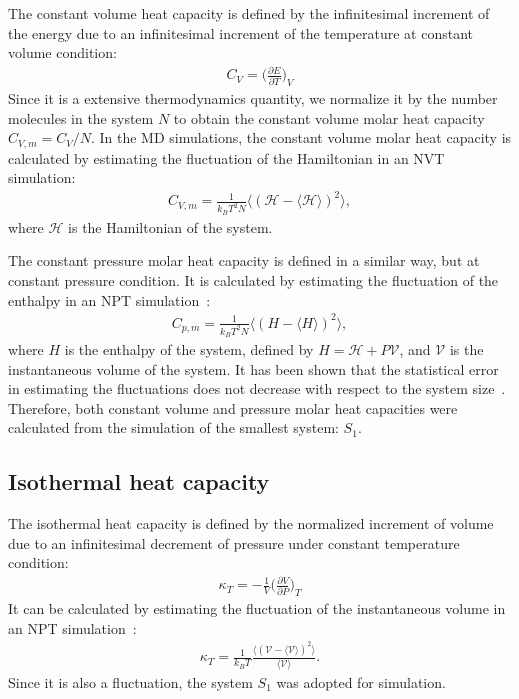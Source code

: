 \documentclass[a4paper,preprint,unsortedaddress,onecolumn,fleqn]{revtex4}
\newcommand{\systemsb}{S_1}
\begin{document}
The constant volume heat capacity is defined by the infinitesimal increment
of the energy due to an infinitesimal increment of the temperature at
constant volume condition: 
\begin{align}
C_V = \Big(\frac{\partial E}{\partial T}\Big)_V
\end{align}
Since it is a extensive thermodynamics quantity, we normalize it by the
number molecules in the system $N$ to obtain the constant volume molar heat
capacity $C_{V,m} = C_V/N$. In the MD simulations, the constant volume molar
heat capacity is calculated by estimating the fluctuation of the Hamiltonian
in an NVT simulation: 
\begin{align}
C_{V,m} = \frac{1}{k_BT^2 N} \langle (\mathcal{H }- \langle\mathcal{H}%
\rangle)^2 \rangle,
\end{align}
where $\mathcal{H}$ is the Hamiltonian of the system. 

The constant pressure molar heat capacity is defined in a similar way, but
at constant pressure condition. It is calculated by estimating the
fluctuation of the enthalpy in an NPT simulation~\cite{wang2011existence}: 
\begin{align}
C_{p,m} = \frac{1}{k_BT^2 N} \langle ( H - \langle H\rangle)^2 \rangle,
\end{align}
where $H$ is the enthalpy of the system, defined by $H = \mathcal{H }+ P%
\mathcal{V}$, and $\mathcal{V}$ is the instantaneous volume of the system.
It has been shown that the statistical error in estimating the fluctuations
does not decrease with respect to the system size~\cite%
{milchev1986fluctuations,ferrenberg1991statistical}. Therefore, both
constant volume and pressure molar heat capacities were calculated from the
simulation of the smallest system: $S_1$.

\subsection{Isothermal heat capacity}

The isothermal heat capacity is defined by the normalized increment of
volume due to an infinitesimal decrement of pressure under constant
temperature condition: 
\begin{align}
\kappa_T = - \frac 1V \Big(\frac{\partial V}{\partial P}\Big)_T
\end{align}
It can be calculated by estimating the fluctuation of the instantaneous
volume in an NPT simulation~\cite{wang2011existence}: 
\begin{align}
\kappa_T = \frac{1}{k_BT} \frac{\langle (\mathcal{V }- \langle \mathcal{V}%
\rangle)^2 \rangle}{\langle \mathcal{V}\rangle}.
\end{align}
Since it is also a fluctuation, the system $S_1$ was adopted for simulation.
\end{document}
